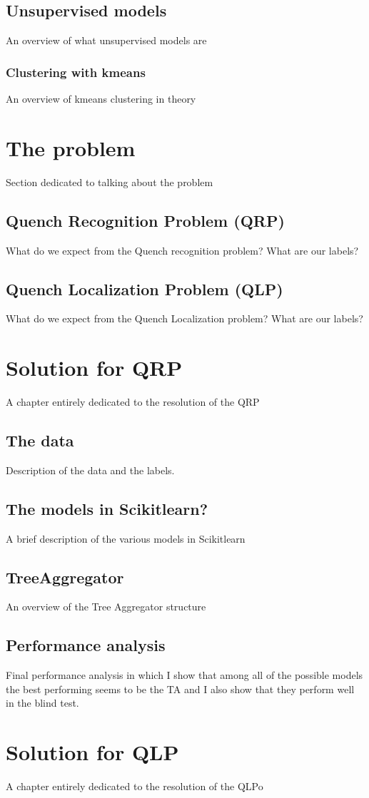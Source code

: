 \documentclass[a4paper]{book}
\begin{document}
\section{Unsupervised models}
An overview of what unsupervised models are
\subsection{Clustering with k\-means}
An overview of k\-means clustering in theory
\chapter{The problem}
Section dedicated to talking about the problem
\section{Quench Recognition Problem (QRP)}
What do we expect from the Quench recognition problem? What are our labels?
\section{Quench Localization Problem (QLP)}
What do we expect from the Quench Localization problem? What are our labels?
\chapter{Solution for QRP}
A chapter entirely dedicated to the resolution of the QRP
\section{The data}
Description of the data and the labels.
\section{The models in Scikit\-learn?}
A brief description of the various models in Scikit\-learn
\section{TreeAggregator}
An overview of the Tree Aggregator structure
\section{Performance analysis}
Final performance analysis in which I show that among all of the possible models the best performing
seems to be the TA and I also show that they perform well in the blind test.
\chapter{Solution for QLP}
A chapter entirely dedicated to the resolution of the QLPo
\end{document}
